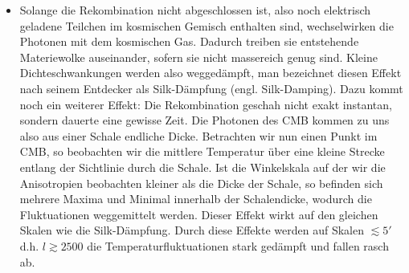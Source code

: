 \documentclass[10pt,a4paper]{article}
\begin{document}
\begin{itemize}
\item Solange die Rekombination nicht abgeschlossen ist, also noch elektrisch geladene Teilchen im kosmischen Gemisch enthalten sind, wechselwirken die Photonen mit dem kosmischen Gas. Dadurch treiben sie entstehende Materiewolke auseinander, sofern sie nicht massereich genug sind. Kleine Dichteschwankungen werden also weggedämpft, man bezeichnet diesen Effekt nach seinem Entdecker als Silk-Dämpfung (engl. Silk-Damping).\cite{A+R} Dazu kommt noch ein weiterer Effekt: Die Rekombination geschah nicht exakt instantan, sondern dauerte eine gewisse Zeit. Die Photonen des CMB kommen zu uns also aus einer Schale endliche Dicke. Betrachten wir nun einen Punkt im CMB, so beobachten wir die mittlere Temperatur über eine kleine Strecke entlang der Sichtlinie durch die Schale. Ist die Winkelskala auf der wir die Anisotropien beobachten kleiner als die Dicke der Schale, so befinden sich mehrere Maxima und Minimal innerhalb der Schalendicke, wodurch die Fluktuationen weggemittelt werden. Dieser Effekt wirkt auf den gleichen Skalen wie die Silk-Dämpfung. Durch diese Effekte werden auf Skalen $\lesssim 5'$ d.h. $l\gtrsim2500$ die Temperaturfluktuationen stark gedämpft und fallen rasch ab.\cite{Schneider}
\end{itemize}
\end{document}
